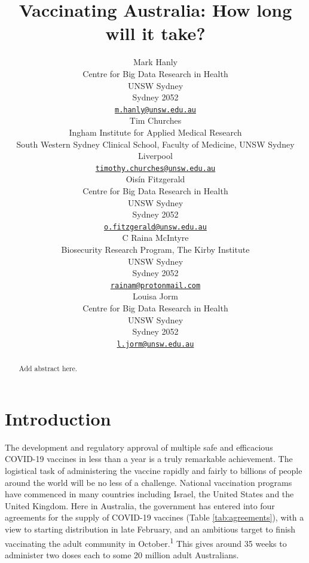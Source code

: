 \documentclass{article}
\title{Vaccinating Australia: How long will it take?}
\author{
    Mark Hanly
   \\
    Centre for Big Data Research in Health \\
    UNSW Sydney \\
  Sydney 2052 \\
  \texttt{\href{mailto:m.hanly@unsw.edu.au}{\nolinkurl{m.hanly@unsw.edu.au}}} \\
   \And
    Tim Churches
   \\
    Ingham Institute for Applied Medical Research \\
    South Western Sydney Clinical School, Faculty of Medicine, UNSW Sydney \\
  Liverpool \\
  \texttt{\href{mailto:timothy.churches@unsw.edu.au}{\nolinkurl{timothy.churches@unsw.edu.au}}} \\
   \And
    Oisín Fitzgerald
   \\
    Centre for Big Data Research in Health \\
    UNSW Sydney \\
  Sydney 2052 \\
  \texttt{\href{mailto:o.fitzgerald@unsw.edu.au}{\nolinkurl{o.fitzgerald@unsw.edu.au}}} \\
   \And
    C Raina McIntyre
   \\
    Biosecurity Research Program, The Kirby Institute \\
    UNSW Sydney \\
  Sydney 2052 \\
  \texttt{\href{mailto:rainam@protonmail.com}{\nolinkurl{rainam@protonmail.com}}} \\
   \And
    Louisa Jorm
   \\
    Centre for Big Data Research in Health \\
    UNSW Sydney \\
  Sydney 2052 \\
  \texttt{\href{mailto:l.jorm@unsw.edu.au}{\nolinkurl{l.jorm@unsw.edu.au}}} \\
  }
\begin{document}
\maketitle

\def\tightlist{}


\begin{abstract}
Add abstract here.
\end{abstract}


\newpage

\hypertarget{introduction}{%
\section{Introduction}\label{introduction}}

The development and regulatory approval of multiple safe and efficacious
COVID-19 vaccines in less than a year is a truly remarkable achievement.
The logistical task of administering the vaccine rapidly and fairly to
billions of people around the world will be no less of a challenge.
National vaccination programs have commenced in many countries including
Israel, the United States and the United Kingdom. Here in Australia, the
government has entered into four agreements for the supply of COVID-19
vaccines (Table \ref{tab:agreements}), with a view to starting
distribution in late February, and an ambitious target to finish
vaccinating the adult community in October.\textsuperscript{1} This
gives around 35 weeks to administer two doses each to some 20 million
adult Australians.
\end{document}
